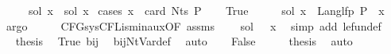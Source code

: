 \begin{isabellebody}
\ \ \ \ \ {\isachardoublequoteopen}sol\ x\ {\isasymsubseteq}\ sol{\isacharprime}{\kern0pt}\ x{\isachardoublequoteclose}\isanewline
%
\isadelimproof
%
\endisadelimproof
%
\isatagproof
{}\isamarkupfalse%
\ {\isacharparenleft}{\kern0pt}cases\ {\isachardoublequoteopen}x\ {\isacharless}{\kern0pt}\ card\ {\isacharparenleft}{\kern0pt}Nts\ P{\isacharparenright}{\kern0pt}{\isachardoublequoteclose}{\isacharparenright}{\kern0pt}\isanewline
\ \ \isamarkupfalse%
\ True\isanewline
\ \ \isamarkupfalse%
\ \isamarkupfalse%
\ {\isachardoublequoteopen}sol\ x\ {\isacharequal}{\kern0pt}\ Lang{\isacharunderscore}{\kern0pt}lfp\ P\ {\isacharparenleft}{\kern0pt}{\isasymgamma}\ x{\isacharparenright}{\kern0pt}{\isachardoublequoteclose}\ \isamarkupfalse%
\ argo\isanewline
\ \ \isamarkupfalse%
\ \isamarkupfalse%
\ CFG{\isacharunderscore}{\kern0pt}sys{\isacharunderscore}{\kern0pt}CFL{\isacharunderscore}{\kern0pt}is{\isacharunderscore}{\kern0pt}min{\isacharunderscore}{\kern0pt}aux{\isacharbrackleft}{\kern0pt}OF\ assms{\isacharbrackright}{\kern0pt}\ \isamarkupfalse%
\ {\isachardoublequoteopen}{\isasymdots}\ {\isasymsubseteq}\ sol{\isacharprime}{\kern0pt}\ {\isacharparenleft}{\kern0pt}{\isasymgamma}{\isacharprime}{\kern0pt}\ {\isacharparenleft}{\kern0pt}{\isasymgamma}\ x{\isacharparenright}{\kern0pt}{\isacharparenright}{\kern0pt}{\isachardoublequoteclose}\ \isamarkupfalse%
\ {\isacharparenleft}{\kern0pt}simp\ add{\isacharcolon}{\kern0pt}\ le{\isacharunderscore}{\kern0pt}fun{\isacharunderscore}{\kern0pt}def{\isacharparenright}{\kern0pt}\isanewline
\ \ \isamarkupfalse%
\ \isamarkupfalse%
\ {\isacharquery}{\kern0pt}thesis\ \isamarkupfalse%
\ True\ bij{\isacharunderscore}{\kern0pt}{\isasymgamma}{\isacharunderscore}{\kern0pt}{\isasymgamma}{\isacharprime}{\kern0pt}\ \isamarkupfalse%
\ bij{\isacharunderscore}{\kern0pt}Nt{\isacharunderscore}{\kern0pt}Var{\isacharunderscore}{\kern0pt}def\ \isamarkupfalse%
\ auto\isanewline
{}\isamarkupfalse%
\isanewline
\ \ \isamarkupfalse%
\ False\isanewline
\ \ \isamarkupfalse%
\ \isamarkupfalse%
\ {\isacharquery}{\kern0pt}thesis\ \isamarkupfalse%
\ auto\isanewline
{}\isamarkupfalse%
%
\endisatagproof
{\isafoldproof}%
%
\isadelimproof
%
\endisadelimproof

\end{isabellebody}
